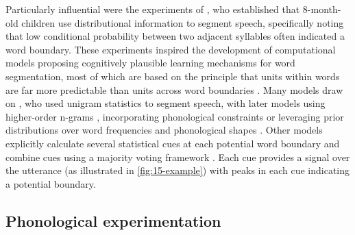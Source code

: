 Particularly influential were the experiments of \citet{Saffran1996learning}, who established that 8-month-old children use distributional information to segment speech, specifically noting that low conditional probability %
between two adjacent syllables often indicated a word boundary. These experiments inspired the development of computational models proposing cognitively plausible learning mechanisms for word segmentation, most of which are based on the principle that units within words are far more predictable than units across word boundaries \citep{harris1955}. Many models draw on \citet{Brent1999}, who used unigram statistics to segment speech, with later models using higher-order n-grams \citep{Venkataraman2001}, incorporating phonological constraints \citep{Blanchard2010} or leveraging prior distributions over word frequencies and phonological shapes \citep{Goldwater2009}. Other models explicitly calculate several statistical cues at each potential word boundary and combine cues using a majority voting framework \citep{ccoltekin2014explicit, Coltekin2017, goriely2023word}. Each cue provides a signal over the utterance (as illustrated in \cref{fig:15-example}) with peaks in each cue indicating a potential boundary. 


\subsection{Phonological experimentation}



